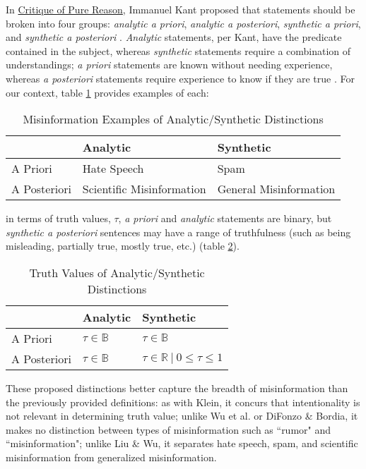 \documentclass[preprint,review,12pt]{elsarticle}
\begin{document}
In \underline{Critique of Pure Reason}, Immanuel Kant proposed that statements should be broken into four groups: \textit{analytic a priori}, \textit{analytic a posteriori}, \textit{synthetic a priori}, and \textit{synthetic a posteriori} \cite{kant1908critique,frege1988collected,quine1951main}. \textit{Analytic} statements, per Kant, have the predicate contained in the subject, whereas \textit{synthetic} statements require a combination of understandings; \textit{a priori} statements are known without needing experience, whereas \textit{a posteriori} statements require experience to know if they are true \cite{wright1997companion}. For our context, table \ref{tab:misinformationexamples} provides examples of each:
\begin{table}[htbp]
    \centering
    \begin{tabular}{ |p{3cm}|p{5cm}|p{5cm}|}
    \hline
    & Analytic & Synthetic\\
    \hline
    A Priori & Hate Speech & Spam\\
    \hline
    A Posteriori &  Scientific Misinformation  & General Misinformation\\
    \hline
    \end{tabular}
    \caption{Misinformation Examples of Analytic/Synthetic Distinctions}
    \label{tab:misinformationexamples}
\end{table}
in terms of truth values, $\tau$, \textit{a priori} and \textit{analytic} statements are binary, but \textit{synthetic a posteriori} sentences may have a range of truthfulness (such as being misleading, partially true, mostly true, etc.) (table \ref{tab:truthvalues}).

\begin{table}[h!]
\centering
\begin{tabular}{ |p{3cm}|p{5cm}|p{5cm}|}
 \hline
  & Analytic & Synthetic\\
 \hline
 A Priori & $\tau \in \mathbb{B}$ & $\tau \in \mathbb{B}$\\
 \hline
 A Posteriori &  $\tau \in \mathbb{B}$  & $\tau \in \mathbb{R} \ | \ 0 \leq \tau \leq 1$ \\
 \hline
\end{tabular}
\caption{Truth Values of Analytic/Synthetic Distinctions}
\label{tab:truthvalues}
\end{table}

These proposed distinctions better capture the breadth of misinformation than the previously provided definitions: as with Klein, it concurs that intentionality is not relevant in determining truth value; unlike Wu et al. or DiFonzo \& Bordia, it makes no distinction between types of misinformation such as ``rumor" and ``misinformation"; unlike Liu \& Wu, it separates hate speech, spam, and scientific misinformation from generalized misinformation.
\end{document}
